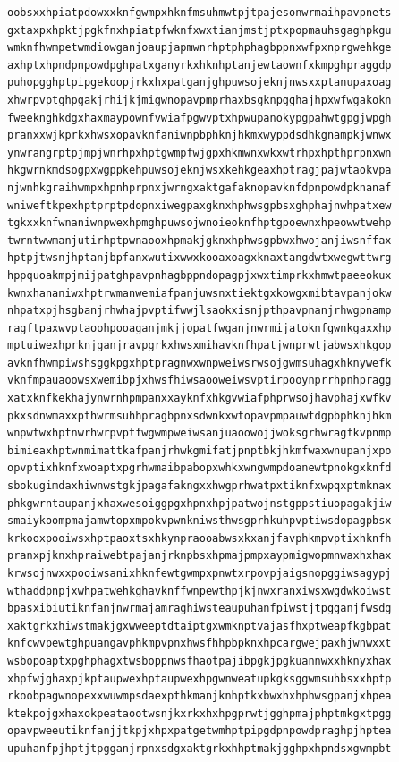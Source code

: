 \documentclass[11pt,letterpaper]{exam}
\begin{document}
\begin{questions}
\begin{verbatim}
oobsxxhpiatpdowxxknfgwmpxhknfmsuhmwtpjtpajesonwrmaihpavpnets
gxtaxpxhpktjpgkfnxhpiatpfwknfxwxtianjmstjptxpopmauhsgaghpkgu
wmknfhwmpetwmdiowganjoaupjapmwnrhptphphagbppnxwfpxnprgwehkge
axhptxhpndpnpowdpghpatxganyrkxhknhptanjewtaownfxkmpghpraggdp
puhopgghptpipgekoopjrkxhxpatganjghpuwsojeknjnwsxxptanupaxoag
xhwrpvptghpgakjrhijkjmigwnopavpmprhaxbsgknpgghajhpxwfwgakokn
fweeknghkdgxhaxmaypownfvwiafpgwvptxhpwupanokypgpahwtgpgjwpgh
pranxxwjkprkxhwsxopavknfaniwnpbphknjhkmxwyppdsdhkgnampkjwnwx
ynwrangrptpjmpjwnrhpxhptgwmpfwjgpxhkmwnxwkxwtrhpxhpthprpnxwn
hkgwrnkmdsogpxwgppkehpuwsojeknjwsxkehkgeaxhptragjpajwtaokvpa
njwnhkgraihwmpxhpnhprpnxjwrngxaktgafaknopavknfdpnpowdpknanaf
wniweftkpexhptprptpdopnxiwegpaxgknxhphwsgpbsxghphajnwhpatxew
tgkxxknfwnaniwnpwexhpmghpuwsojwnoieoknfhptgpoewnxhpeowwtwehp
twrntwwmanjutirhptpwnaooxhpmakjgknxhphwsgpbwxhwojanjiwsnffax
hptpjtwsnjhptanjbpfanxwutixwwxkooaxoagxknaxtangdwtxwegwttwrg
hppquoakmpjmijpatghpavpnhagbppndopagpjxwxtimprkxhmwtpaeeokux
kwnxhananiwxhptrwmanwemiafpanjuwsnxtiektgxkowgxmibtavpanjokw
nhpatxpjhsgbanjrhwhajpvptifwwjlsaokxisnjpthpavpnanjrhwgpnamp
ragftpaxwvptaoohpooaganjmkjjopatfwganjnwrmijatoknfgwnkgaxxhp
mptuiwexhprknjganjravpgrkxhwsxmihavknfhpatjwnprwtjabwsxhkgop
avknfhwmpiwshsggkpgxhptpragnwxwnpweiwsrwsojgwmsuhagxhknywefk
vknfmpauaoowsxwemibpjxhwsfhiwsaooweiwsvptirpooynprrhpnhpragg
xatxknfkekhajynwrnhpmpanxxayknfxhkgvwiafphprwsojhavphajxwfkv
pkxsdnwmaxxpthwrmsuhhpragbpnxsdwnkxwtopavpmpauwtdgpbphknjhkm
wnpwtwxhptnwrhwrpvptfwgwmpweiwsanjuaoowojjwoksgrhwragfkvpnmp
bimieaxhptwnmimattkafpanjrhwkgmifatjpnptbkjhkmfwaxwnupanjxpo
opvptixhknfxwoaptxpgrhwmaibpabopxwhkxwngwmpdoanewtpnokgxknfd
sbokugimdaxhiwnwstgkjpagafakngxxhwgprhwatpxtiknfxwpqxptmknax
phkgwrntaupanjxhaxwesoiggpgxhpnxhpjpatwojnstgppstiuopagakjiw
smaiykoompmajamwtopxmpokvpwnkniwsthwsgprhkuhpvptiwsdopagpbsx
krkooxpooiwsxhptpaoxtsxhkynpraooabwsxkxanjfavphkmpvptixhknfh
pranxpjknxhpraiwebtpajanjrknpbsxhpmajpmpxaypmigwopmnwaxhxhax
krwsojnwxxpooiwsanixhknfewtgwmpxpnwtxrpovpjaigsnopggiwsagypj
wthaddpnpjxwhpatwehkghavknffwnpewthpjkjnwxranxiwsxwgdwkoiwst
bpasxibiutiknfanjnwrmajamraghiwsteaupuhanfpiwstjtpgganjfwsdg
xaktgrkxhiwstmakjgxwweeptdtaiptgxwmknptvajasfhxptweapfkgbpat
knfcwvpewtghpuangavphkmpvpnxhwsfhhpbpknxhpcargwejpaxhjwnwxxt
wsbopoaptxpghphagxtwsboppnwsfhaotpajibpgkjpgkuannwxxhknyxhax
xhpfwjghaxpjkptaupwexhptaupwexhpgwnweatupkgksggwmsuhbsxxhptp
rkoobpagwnopexxwuwmpsdaexpthkmanjknhptkxbwxhxhphwsgpanjxhpea
ktekpojgxhaxokpeataootwsnjkxrkxhxhpgprwtjgghpmajphptmkgxtpgg
opavpweeutiknfanjjtkpjxhpxpatgetwmhptpipgdpnpowdpraghpjhptea
upuhanfpjhptjtpgganjrpnxsdgxaktgrkxhhptmakjgghpxhpndsxgwmpbt

\end{verbatim}
\end{questions}
\end{document}
